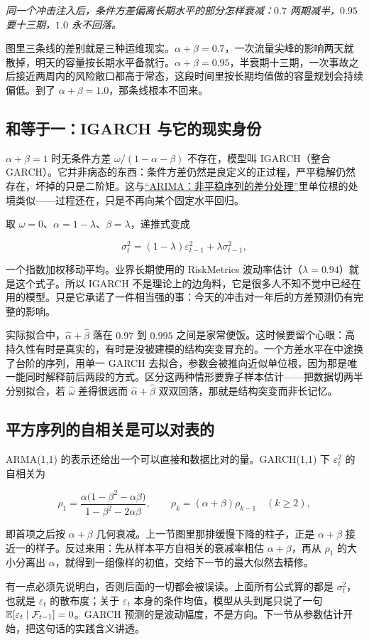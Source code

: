 \emph{同一个冲击注入后，条件方差偏离长期水平的部分怎样衰减：\(0.7\) 两期减半，\(0.95\) 要十三期，\(1.0\) 永不回落。}

图里三条线的差别就是三种运维现实。\(\alpha+\beta=0.7\)，一次流量尖峰的影响两天就散掉，明天的容量按长期水平备就行。\(\alpha+\beta=0.95\)，半衰期十三期，一次事故之后接近两周内的风险敞口都高于常态，这段时间里按长期均值做的容量规划会持续偏低。到了 \(\alpha+\beta=1.0\)，那条线根本不回来。

\subsection{和等于一：IGARCH 与它的现实身份}

\(\alpha+\beta=1\) 时无条件方差 \(\omega/(1-\alpha-\beta)\) 不存在，模型叫 IGARCH（整合 GARCH）。它并非病态的东西：条件方差仍然是良定义的正过程，严平稳解仍然存在，坏掉的只是二阶矩。这与\hyperref[sec:06-Random-Processes/06-ARMA-and-ARIMA/03]{``ARIMA：非平稳序列的差分处理''}里单位根的处境类似——过程还在，只是不再向某个固定水平回归。

取 \(\omega=0\)、\(\alpha=1-\lambda\)、\(\beta=\lambda\)，递推式变成

\[
\sigma_t^2=(1-\lambda)\varepsilon_{t-1}^2+\lambda\sigma_{t-1}^2 ,
\]

一个指数加权移动平均。业界长期使用的 RiskMetrics 波动率估计（\(\lambda=0.94\)）就是这个式子。所以 IGARCH 不是理论上的边角料，它是很多人不知不觉中已经在用的模型。只是它承诺了一件相当强的事：今天的冲击对一年后的方差预测仍有完整的影响。

实际拟合中，\(\hat\alpha+\hat\beta\) 落在 \(0.97\) 到 \(0.995\) 之间是家常便饭。这时候要留个心眼：高持久性有时是真实的，有时是没被建模的结构突变冒充的。一个方差水平在中途换了台阶的序列，用单一 GARCH 去拟合，参数会被推向近似单位根，因为那是唯一能同时解释前后两段的方式。区分这两种情形要靠子样本估计——把数据切两半分别拟合，若 \(\hat\omega\) 差得很远而 \(\hat\alpha+\hat\beta\) 双双回落，那就是结构突变而非长记忆。

\subsection{平方序列的自相关是可以对表的}

ARMA(1,1) 的表示还给出一个可以直接和数据比对的量。GARCH(1,1) 下 \(\varepsilon_t^2\) 的自相关为

\[
\rho_1=\frac{\alpha\big(1-\beta^2-\alpha\beta\big)}{1-\beta^2-2\alpha\beta},
\qquad
\rho_k=(\alpha+\beta)\rho_{k-1}\quad(k\ge2),
\]

即首项之后按 \(\alpha+\beta\) 几何衰减。上一节图里那排缓慢下降的柱子，正是 \(\alpha+\beta\) 接近一的样子。反过来用：先从样本平方自相关的衰减率粗估 \(\alpha+\beta\)，再从 \(\rho_1\) 的大小分离出 \(\alpha\)，就得到一组像样的初值，交给下一节的最大似然去精修。

有一点必须先说明白，否则后面的一切都会被误读。上面所有公式算的都是 \(\sigma_t^2\)，也就是 \(\varepsilon_t\) 的散布度；关于 \(\varepsilon_t\) 本身的条件均值，模型从头到尾只说了一句 \(\mathbb{E}[\varepsilon_t\mid\mathcal F_{t-1}]=0\)。GARCH 预测的是波动幅度，不是方向。下一节从参数估计开始，把这句话的实践含义讲透。
